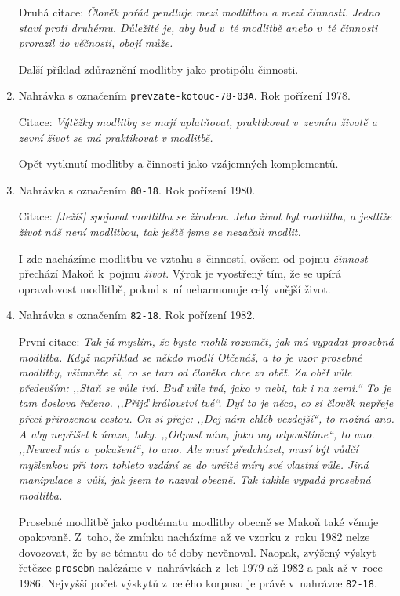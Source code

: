 \begin{enumerate}
{    Druhá citace: \textit{%
      Člověk pořád pendluje mezi modlitbou a mezi činností. Jedno staví proti
      druhému. Důležité je, aby buď v~té modlitbě anebo v~té činnosti prorazil
      do věčnosti, obojí může.
    }

    Další příklad zdůraznění modlitby jako protipólu činnosti.
  }
  \item{
    Nahrávka s označením \texttt{prevzate-kotouc-78-03A}.
    Rok pořízení 1978.

    Citace: \textit{%
      Výtěžky modlitby se mají uplatňovat, praktikovat v~zevním životě a zevní
      život se má praktikovat v modlitbě.
    }

    Opět vytknutí modlitby a činnosti jako vzájemných komplementů.
  }
  \item{
    Nahrávka s označením \texttt{80-18}.
    Rok pořízení 1980.

    Citace: \textit{%
      [Ježíš] spojoval modlitbu se životem. Jeho život byl modlitba, a jestli\-že
      život náš není modlitbou, tak ještě jsme se nezačali modlit.
    }

    I zde nacházíme modlitbu ve vztahu s~činností, ovšem od pojmu
    \textit{činnost} přechází Makoň k~pojmu \textit{život}. Výrok je vyostřený
    tím, že se upírá opravdovost modlitbě, pokud s~ní neharmonuje celý vnější
    život.
  }
  \item{
    Nahrávka s označením \texttt{82-18}.
    Rok pořízení 1982.

    První citace: \textit{%
      Tak já myslím, že byste mohli rozumět, jak má vypadat prosebná modlitba.
      Když například se někdo modlí Otčenáš, a to je vzor prosebné modlitby,
      všimněte si, co se tam od člověka chce za oběť. Za oběť vůle především:
      ,,Staň se vůle tvá. Buď vůle tvá, jako v~nebi, tak i na zemi.`` To je tam
      doslova řečeno. ,,Přijď království tvé``. Dyť to je něco, co si člověk
      nepřeje přeci přirozenou cestou. On si přeje: ,,Dej nám chléb vezdejší``,
      to možná ano. A aby nepřišel k úrazu, taky. ,,Odpusť nám, jako my
      odpouštíme``, to ano. ,,Neuveď nás v~pokušení``, to ano. Ale musí
      předcházet, musí být vůdčí myšlenkou při tom tohleto vzdání se do určité
      míry své vlastní vůle. Jiná manipulace s~vůlí, jak jsem to nazval obecně.
      Tak takhle vypadá prosebná modlitba.
    }

    Prosebné modlitbě jako podtématu modlitby obecně se Makoň také věnuje
    opakovaně. Z~toho, že zmínku nacházíme až ve vzorku z~roku 1982 nelze
    dovozovat, že by se tématu do té doby nevěnoval. Naopak, zvýšený výskyt
    řetězce \texttt{prosebn} nalézáme v~nahrávkách z~let 1979 až 1982 a pak až
    v~roce 1986. Nejvyšší počet výskytů z~celého korpusu je právě v~nahrávce
    \texttt{82-18}.

}
\end{enumerate}
